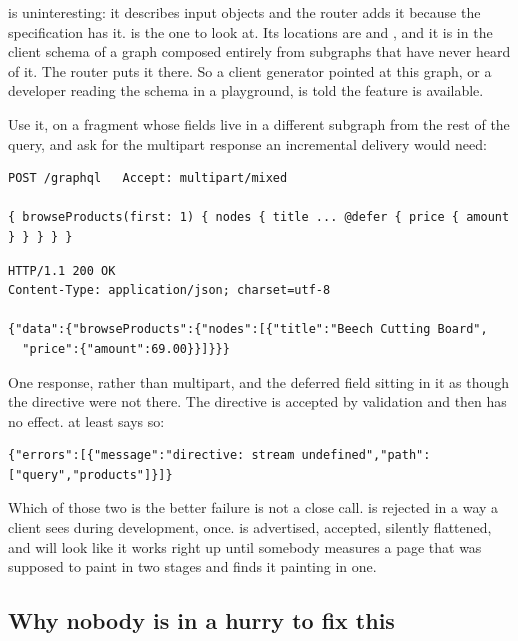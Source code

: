  is uninteresting: it describes input objects and the router adds
it because the specification has it.  is the one to look at. Its
locations are  and , and it is in
the client schema of a graph composed entirely from subgraphs that have never
heard of it. The router puts it there. So a client generator pointed at this
graph, or a developer reading the schema in a playground, is told the feature
is available.

Use it, on a fragment whose fields live in a different subgraph from the rest
of the query, and ask for the multipart response an incremental delivery would
need:

\begin{verbatim}
POST /graphql   Accept: multipart/mixed

{ browseProducts(first: 1) { nodes { title ... @defer { price { amount } } } } }
\end{verbatim}

\begin{verbatim}
HTTP/1.1 200 OK
Content-Type: application/json; charset=utf-8

{"data":{"browseProducts":{"nodes":[{"title":"Beech Cutting Board",
  "price":{"amount":69.00}}]}}}
\end{verbatim}

%
One response,  rather than multipart, and the deferred
field sitting in it as though the directive were not there. The directive is
accepted by validation and then has no effect.  at least says so:

\begin{verbatim}
{"errors":[{"message":"directive: stream undefined","path":["query","products"]}]}
\end{verbatim}

Which of those two is the better failure is not a close call.  is
rejected in a way a client sees during development, once.  is
advertised, accepted, silently flattened, and will look like it works right up
until somebody measures a page that was supposed to paint in two stages and
finds it painting in one.

\subsection*{Why nobody is in a hurry to fix this}

